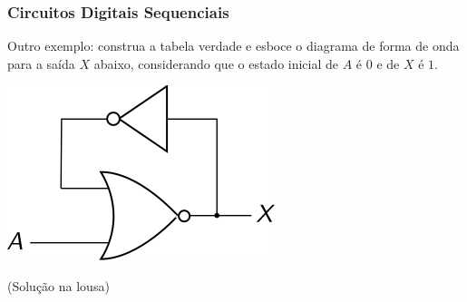 \documentclass{beamer}
\begin{document}
\begin{frame}
\begin{center}
%
\end{center}

\vspace{-10pt}

\end{frame}

\begin{frame}
\frametitle{Circuitos Digitais Sequenciais}

Outro exemplo: construa a tabela verdade e esboce o diagrama de
forma de onda para a saída $X$ abaixo, considerando que o estado
inicial de $A$ é $0$ e de $X$ é $1$.

\vspace*{\fill}

\begin{center}
	\includegraphics{images/circuit2}
\end{center}

\vspace*{\fill}

(Solução na lousa)

\end{frame}
\end{document}
